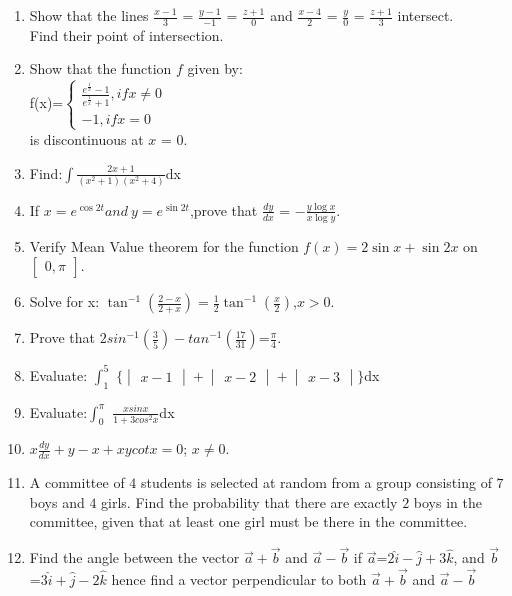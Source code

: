 \documentclass[12pt,-letter paper]{article}
\providecommand{\mydet}[1]{\ensuremath{\begin{vmatrix}#1\end{vmatrix}}}
\providecommand{\myvec}[1]{\ensuremath{\begin{bmatrix}#1\end{bmatrix}}}
\providecommand{\brak}[1]{\ensuremath{\left(#1\right)}}
\begin{document}
\begin{enumerate}
    \item Show that the lines $\frac {x-1} {3} $ = $\frac {y-1} {-1} $ = $\frac {z+1} {0} $ and $\frac {x-4} {2} $ = $\frac {y} {0} $ = $\frac {z+1} {3} $ intersect.\\Find their point of intersection.
	
     \item Show that the function $f$ given by: \\
f(x)=$\begin{cases}\frac{e^{\frac{1}{x}}-1}{e^{\frac{1}{x}}+1}, if x\neq0\\    {-1}, if x = 0 \end{cases}$ \\is discontinuous at $x$ = $0$.

\item Find:$\int  \frac {2x+1} {\brak{x^2+1} \brak{x^2+4}}$dx

     \item If $ x = e^{\cos2t} and  \ y = e^{\sin2t} $,prove that $ \frac {dy} {dx} $ = $ -\frac{y \log x} {x \log y}	$. 
     \item Verify Mean Value theorem for the function $f\brak{x}=2\sin x+\sin 2x$ on $\myvec{0,\pi} $.
	

     \item Solve for x: $\tan^{-1} \brak{\frac {2 - x}{2 + x}} = \frac {1}{2} \tan^{-1}\brak{\frac {x}{2}}$,$x > 0$. 
      \item Prove that $2sin^{-1}\brak{\frac{3}{5}}-tan^{-1}\brak{\frac{17}{31}}$=$\frac{\pi}{4}$.

      \item Evaluate: $\int_{1}^{5}$ $\{{\mydet{x - 1} + \mydet{x - 2} + \mydet{x - 3}}\}$dx 
      \item Evaluate:$\int_{0}^{\pi}$ $ \frac {xsinx} {1+3cos^2x} $dx	     

      \item  $x\frac {dy} {dx}  + y - x + xycotx=0$; $x\neq0$.
	      
      \item  A committee of $4$ students is selected at random from a group consisting of $7$ boys and $4$ girls. Find the probability that there are exactly $2$ boys in the committee, given that at least one girl must be there in the committee.

      \item Find the angle between the vector $\overset{\rightarrow}{a}+\overset{\rightarrow}{b}$ and $\overset{\rightarrow}{a}-\overset{\rightarrow}{b}$ if $\overset{\rightarrow}{a}$=$2\hat{i}-\hat{j}+3\hat{k}$, and $\overset{\rightarrow}{b}$=$3\hat{i}+\hat{j}-2\hat{k}$ hence find a vector perpendicular to both $\overset{\rightarrow}{a}+\overset{\rightarrow}{b}$ and $\overset{\rightarrow}{a}-\overset{\rightarrow}{b}$


\end{enumerate}
\end{document}
